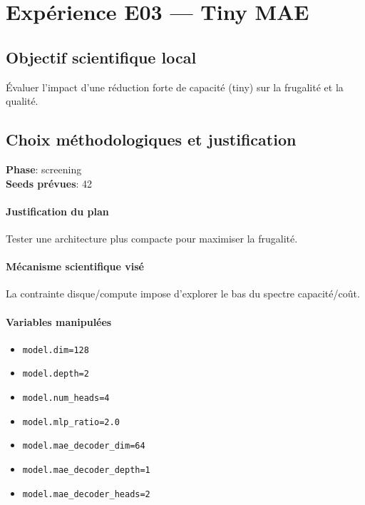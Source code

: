 \documentclass[11pt,a4paper]{article}
\begin{document}
\section{Expérience E03 --- Tiny MAE}
\subsection{Objectif scientifique local}
Évaluer l'impact d'une réduction forte de capacité (tiny) sur la frugalité et la qualité.

\subsection{Choix méthodologiques et justification}
\textbf{Phase}: screening\\
\textbf{Seeds prévues}: 42\\


\paragraph{Justification du plan}
Tester une architecture plus compacte pour maximiser la frugalité.

\paragraph{Mécanisme scientifique visé}
La contrainte disque/compute impose d'explorer le bas du spectre capacité/coût.

\paragraph{Variables manipulées}
\begin{itemize}
\item \texttt{model.dim=128}
\item \texttt{model.depth=2}
\item \texttt{model.num\_heads=4}
\item \texttt{model.mlp\_ratio=2.0}
\item \texttt{model.mae\_decoder\_dim=64}
\item \texttt{model.mae\_decoder\_depth=1}
\item \texttt{model.mae\_decoder\_heads=2}
\end{itemize}
\end{document}
